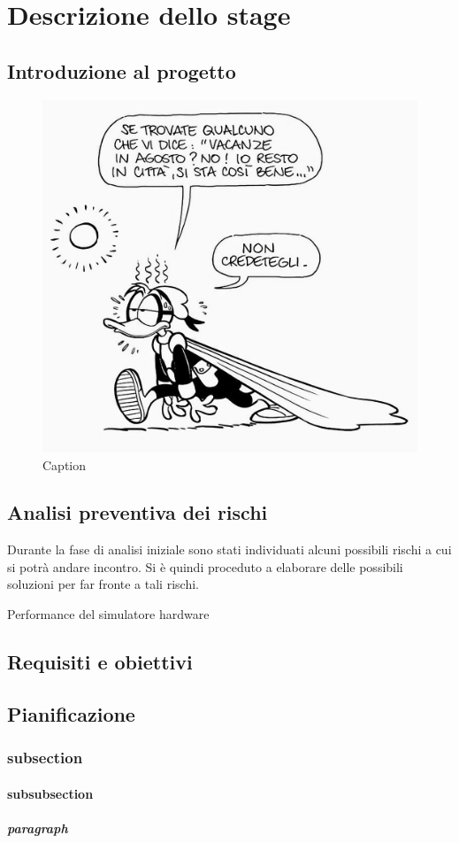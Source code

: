 \chapter{Descrizione dello stage}
\label{chap:descrizione-stage}

\section{Introduzione al progetto}
\begin{figure}[!ht] 
    \centering 
    \includegraphics[width=0.5\columnwidth]{img/pk_estate.jpeg} 
    \caption{Caption}
    \label{fig:pk_estate}
\end{figure}
\lipsum[1]

\section{Analisi preventiva dei rischi}

Durante la fase di analisi iniziale sono stati individuati alcuni possibili rischi a cui si potrà andare incontro.
Si è quindi proceduto a elaborare delle possibili soluzioni per far fronte a tali rischi.

\begin{risk}{Performance del simulatore hardware}
    \label{risk:hardware-simulator} 
\end{risk}

\section{Requisiti e obiettivi}

\section{Pianificazione}
\lipsum[1]

\subsection{subsection}
\lipsum[1]

\subsubsection{subsubsection}
\lipsum[1]

\paragraph{paragraph}
\lipsum[1]

\newpage